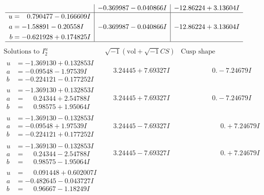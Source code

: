 \documentclass[1p]{elsarticle_modified}
\theoremstyle{definition}
\newcommand{\I}{\sqrt{-1}}
\begin{document}
$$\begin{array}{c|c|c}
 & -0.369987 - 0.040866 I & -12.86224 + 3.13604 I \\ \hline\begin{aligned}
u &= \phantom{-}0.790477 - 0.166609 I \\
a &= -1.58891 - 0.20558 I \\
b &= -0.621928 + 0.174825 I\end{aligned}
 & -0.369987 - 0.040866 I & -12.86224 + 3.13604 I\\
 \hline 
 \end{array}$$\newpage$$\begin{array}{c|c|c}  
\text{Solutions to }I^u_{2}& \I (\text{vol} + \sqrt{-1}CS) & \text{Cusp shape}\\
 \hline 
\begin{aligned}
u &= -1.369130 + 0.132853 I \\
a &= -0.09548 - 1.97539 I \\
b &= -0.224121 - 0.177252 I\end{aligned}
 & \phantom{-}3.24445 + 7.69327 I & \phantom{-0.000000 } 0. - 7.24679 I \\ \hline\begin{aligned}
u &= -1.369130 + 0.132853 I \\
a &= \phantom{-}0.24344 + 2.54788 I \\
b &= \phantom{-}0.98575 + 1.95064 I\end{aligned}
 & \phantom{-}3.24445 + 7.69327 I & \phantom{-0.000000 } 0. - 7.24679 I \\ \hline\begin{aligned}
u &= -1.369130 - 0.132853 I \\
a &= -0.09548 + 1.97539 I \\
b &= -0.224121 + 0.177252 I\end{aligned}
 & \phantom{-}3.24445 - 7.69327 I & \phantom{-0.000000 -}0. + 7.24679 I \\ \hline\begin{aligned}
u &= -1.369130 - 0.132853 I \\
a &= \phantom{-}0.24344 - 2.54788 I \\
b &= \phantom{-}0.98575 - 1.95064 I\end{aligned}
 & \phantom{-}3.24445 - 7.69327 I & \phantom{-0.000000 -}0. + 7.24679 I \\ \hline\begin{aligned}
u &= \phantom{-}0.091448 + 0.602007 I \\
a &= -0.482645 - 0.043727 I \\
b &= \phantom{-}0.96667 - 1.18249 I\end{aligned}

\end{array}$$
\end{document}
